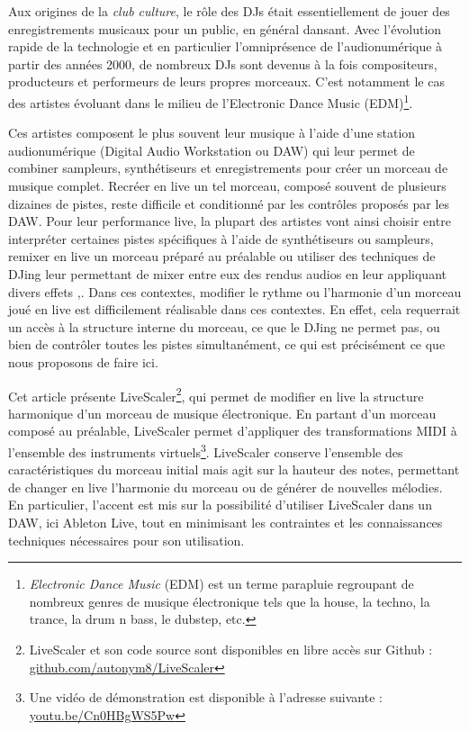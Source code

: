 Aux origines de la \emph{club culture}, le rôle des DJs était essentiellement de jouer des enregistrements musicaux pour un public, en général dansant. Avec l’évolution rapide de la technologie et en particulier l’omniprésence de l’audionumérique à partir des années 2000, de nombreux DJs sont devenus à la fois compositeurs, producteurs et performeurs de leurs propres morceaux. C'est notamment le cas des artistes évoluant dans le milieu de l'Electronic Dance Music (EDM)\footnote{\emph{Electronic Dance Music} (EDM) est un terme parapluie regroupant de nombreux genres de musique électronique tels que la house, la techno, la trance, la drum n bass, le dubstep, etc. }.


Ces artistes composent le plus souvent leur musique à l’aide d’une station audionumérique (Digital Audio Workstation ou DAW) qui leur permet de combiner sampleurs, synthétiseurs et enregistrements pour créer un morceau de musique complet. Recréer en live un tel morceau, composé souvent de plusieurs dizaines de pistes, reste difficile et conditionné par les contrôles proposés par les DAW. Pour leur performance live, la plupart des artistes vont ainsi choisir entre interpréter certaines pistes spécifiques à l'aide de synthétiseurs ou sampleurs, remixer en live un morceau préparé au préalable ou utiliser des techniques de DJing leur permettant de mixer entre eux des rendus audios en leur appliquant divers effets \cite{ferreira2008sound},\cite{magana2018performance}.  Dans ces contextes,  modifier le rythme ou l'harmonie d’un morceau joué en live est difficilement réalisable dans ces contextes. En effet, cela requerrait un accès à la structure interne du morceau, ce que le DJing ne permet pas, ou bien de contrôler toutes les pistes simultanément, ce qui est précisément ce que nous proposons de faire ici.

Cet article présente LiveScaler\footnote{LiveScaler et son code source sont disponibles en libre accès sur Github : \href{https://github.com/autonym8/LiveScaler}{github.com/autonym8/LiveScaler}}, qui per\-met de modifier en live la structure harmonique d'un morceau de musique électronique. En partant d'un morceau composé au préalable, LiveScaler permet d'appliquer des transformations MIDI à l'ensemble des instruments virtuels\footnote{Une vidéo de démonstration est disponible à l'adresse suivante : \href{ https://youtu.be/Cn0HBgWS5Pw}{youtu.be/Cn0HBgWS5Pw}}. LiveScaler conserve l'ensemble des caractéristiques du morceau initial mais agit sur la hauteur des notes, permettant de changer en live l'harmonie du morceau ou de générer de nouvelles mélodies. En particulier, l'accent est mis sur la possibilité d'utiliser LiveScaler dans un DAW, ici Ableton Live, tout en minimisant les contraintes et les connaissances techniques nécessaires pour son utilisation.

